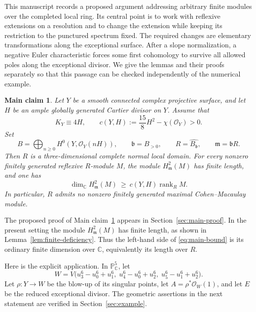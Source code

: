 \documentclass[11pt,reqno]{amsart}
\numberwithin{equation}{section}
\newtheorem{mainclaim}[theorem]{Main claim}
\theoremstyle{definition}
\theoremstyle{remark}
\newcommand{\C}{\mathbb C}
\newcommand{\PP}{\mathbb P}
\newcommand{\OO}{\mathcal O}
\newcommand{\mm}{\mathfrak m}
\newcommand{\bb}{\mathfrak b}
\newcommand{\rk}{\operatorname{rank}}
\begin{document}
This manuscript records a proposed argument addressing arbitrary finite
modules over the completed local ring. Its central point is to work with
reflexive extensions on a resolution and to change the extension while
keeping its restriction to the punctured spectrum fixed. The required
changes are elementary transformations along the exceptional surface.
After a slope normalization, a negative Euler characteristic forces some
first cohomology to survive all allowed poles along the exceptional
divisor. We give the lemmas and their proofs separately so that this
passage can be checked independently of the numerical example.

\begin{mainclaim}\label{thm:main}
Let $Y$ be a smooth connected complex projective surface, and let $H$ be
an ample globally generated Cartier divisor on $Y$. Assume that
\begin{equation}\label{eq:main-hypotheses}
 K_Y\equiv4H,
 \qquad
 c(Y,H):=\frac{15}{8}H^2-\chi(\OO_Y)>0.
\end{equation}
Set
\begin{equation}\label{eq:section-ring}
 B=\bigoplus_{n\geq0}H^0(Y,\OO_Y(nH)),\qquad
 \bb=B_{>0},\qquad R=\widehat{B_\bb},\qquad \mm=\bb R.
\end{equation}
Then $R$ is a three-dimensional complete normal local domain. For every
nonzero finitely generated reflexive $R$-module $M$, the module
$H^2_\mm(M)$ has finite length, and one has
\begin{equation}\label{eq:main-bound}
 \dim_\C H^2_\mm(M)\ \geq\ c(Y,H)\rk_R M.
\end{equation}
In particular, $R$ admits no nonzero finitely generated maximal
Cohen--Macaulay module.
\end{mainclaim}

The proposed proof of Main claim~\ref{thm:main} appears in
Section~\ref{sec:main-proof}. In the present setting the module
$H^2_\mm(M)$ has finite length, as shown in
Lemma~\ref{lem:finite-deficiency}. Thus the left-hand side of
\eqref{eq:main-bound} is its ordinary finite dimension over $\C$,
equivalently its length over $R$.

Here is the explicit application. In $\PP^5_\C$, let
\begin{equation}\label{eq:W}
 W=V\bigl(u_3^6-u_0^6+u_1^6,\;
          u_4^6-u_0^6+u_2^6,\;
          u_5^6-u_1^6+u_2^6\bigr).
\end{equation}
Let $\rho:Y\to W$ be the blow-up of its singular points, let
$A=\rho^*\OO_W(1)$, and let $E$ be the reduced exceptional divisor.
The geometric assertions in the next statement are verified in
Section~\ref{sec:example}.
\end{document}
